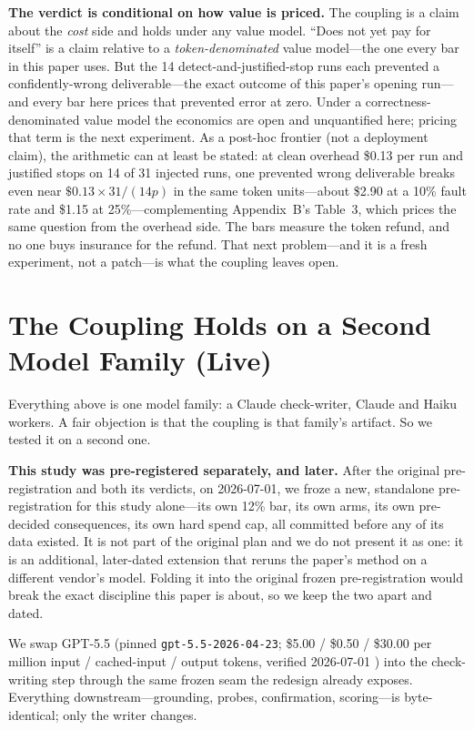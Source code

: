\documentclass[acmsmall,screen]{acmart}
\begin{document}
\textbf{The verdict is conditional on how value is priced.} The coupling is a
claim about the \emph{cost} side and holds under any value model. ``Does not yet
pay for itself'' is a claim relative to a \emph{token-denominated} value
model---the one every bar in this paper uses. But the 14 detect-and-justified-stop
runs each prevented a confidently-wrong deliverable---the exact outcome of this
paper's opening run---and every bar here prices that prevented error at zero.
Under a correctness-denominated value model the economics are open and
unquantified here; pricing that term is the next experiment. As a post-hoc frontier
(not a deployment claim), the arithmetic can at least be stated: at clean overhead
\$0.13 per run and justified stops on 14 of 31 injected runs, one prevented wrong
deliverable breaks even near $\$0.13 \times 31/(14p)$ in the same token units---about
\$2.90 at a 10\% fault rate and \$1.15 at 25\%---complementing Appendix~B's Table~3,
which prices the same question from the overhead side. The bars measure the
token refund, and no one buys insurance for the refund. That next problem---and it
is a fresh experiment, not a patch---is what the coupling leaves open.

\section{The Coupling Holds on a Second Model Family (Live)}
Everything above is one model family: a Claude check-writer, Claude and Haiku
workers. A fair objection is that the coupling is that family's artifact. So we
tested it on a second one.

\textbf{This study was pre-registered separately, and later.} After the original
pre-registration and both its verdicts, on 2026-07-01, we froze a new, standalone
pre-registration for this study alone---its own 12\% bar, its own arms, its own
pre-decided consequences, its own hard spend cap, all committed before any of its
data existed. It is not part of the original plan and we do not present it as one:
it is an additional, later-dated extension that reruns the paper's method on a
different vendor's model. Folding it into the original frozen pre-registration
would break the exact discipline this paper is about, so we keep the two apart
and dated.

We swap GPT-5.5 (pinned \texttt{gpt-5.5-2026-04-23}; \$5.00 / \$0.50 / \$30.00 per
million input / cached-input / output tokens, verified 2026-07-01 \cite{ref38})
into the check-writing step through the same frozen seam the redesign already
exposes. Everything downstream---grounding, probes, confirmation, scoring---is
byte-identical; only the writer changes.
\end{document}
